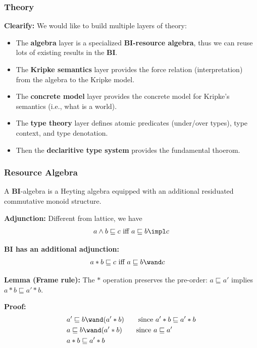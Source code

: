 \newcommand{\store}[1]{\langle #1 \rangle}

\begin{frame}[fragile]
    \frametitle{Theory}

\textbf{Clearify:} We would like to build multiple layers of theory:
\begin{itemize}
    \item The \textbf{algebra} layer is a specialized \textbf{BI-resource algebra}, thus we can reuse lots of existing results in the \textbf{BI}.
    \item The \textbf{Kripke semantics} layer provides the force relation (interpretation) from the algebra to the Kripke model.
    \item The \textbf{concrete model} layer provides the concrete model for Kripke's semantics (i.e., what is a world).
    \item The \textbf{type theory} layer defines atomic predicates (under/over types), type context, and type denotation.
    \item Then the \textbf{declaritive type system} provides the fundamental thoerom.
\end{itemize}
        
\end{frame}

\begin{frame}[fragile]
    \frametitle{Resource Algebra}

A \textbf{BI}-algebra is a Heyting algebra equipped with an additional residuated commutative monoid structure.

\textbf{Adjunction:} Different from lattice, we have
\begin{align*}
    a \land b \sqsubseteq c \text{ iff } a \sqsubseteq b \impl c
\end{align*}\noindent

\textbf{BI has an additional adjunction:}
\begin{align*}
    &a * b \sqsubseteq c \text{ iff } a \sqsubseteq b \wand c
\end{align*}\noindent

\textbf{Lemma (Frame rule):} The $*$ operation preserves the pre-order: $a \sqsubseteq a'$ implies $a * b \sqsubseteq a' * b$.

\textbf{Proof:} 
\begin{align*}
    &a' \sqsubseteq b \wand (a' * b)  \qquad \text{since } a' * b \sqsubseteq a' * b
    \\&a \sqsubseteq b \wand (a' * b)  \qquad \text{since } a \sqsubseteq a'
    \\&a * b \sqsubseteq a' * b 
\end{align*}\noindent
        
\end{frame}

